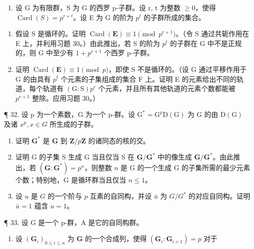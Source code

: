 \begin{enumerate}
\def\labelenumi{\arabic{enumi}。}
\setcounter{enumi}{30}
\tightlist
\item
  设 G 为有限群，S 为 G 的西罗 p-子群。设 r, t 为整数 \(\geqslant0\)，使得 \(\operatorname{Card}(S)=p^{r+t}\)。设 E 为 G 的阶为 \(p^{t}\) 的子群所成的集合。
\end{enumerate}

\begin{enumerate}
\def\labelenumi{(\alph{enumi})}
\item
  假设 S 是循环的。证明 \(\operatorname{Card}(\mathbf{E}) \equiv 1 \pmod{p^{r+1}}\)。（令 S 通过共轭作用在 E 上，并利用习题 30。）由此推出，若 S 的阶为 \(p^{t}\) 的子群在 G 中不是正规的，则 G 中至少有 \(1 + p^{r+1}\) 个西罗 p-子群。
\item
  证明 \(\operatorname{Card}(\mathbf{E}) \equiv 1 \pmod{p}\)，即使 S 不是循环的。（设 G 通过平移作用于 G 的由具有 \(p^{t}\) 个元素的子集组成的集合 F 上。证明 E 的元素给出不同的轨道，每个轨道有 \((\mathrm{G}: \mathrm{S})p^{r}\) 个元素，并且所有其他轨道的元素个数都能被 \(p^{r+1}\) 整除。应用习题 30。）
\end{enumerate}

¶ 32. 设 p 为一个素数，G 为一个 p-群。设 \(\mathrm{G}^{*} = \mathrm{G}^{p}\mathrm{D}(\mathrm{G})\) 为 G 的由 \(\mathrm{D}(\mathrm{G})\) 及诸 \(x^{p}, x \in G\) 所生成的子群。

\begin{enumerate}
\def\labelenumi{(\alph{enumi})}
\item
  证明 \(\mathbf{G}^*\) 是 \(\mathbf{G}\) 到 \(\mathbf{Z} / p\mathbf{Z}\) 的诸同态的核的交。
\item
  证明 G 的子集 S 生成 G 当且仅当 S 在 \(\mathbf{G} / \mathbf{G}^*\) 中的像生成 \(\mathbf{G} / \mathbf{G}^*\)。由此推出，若 \((\mathbf{G}:\mathbf{G}^{*}) = p^{n}\)，则整数 \(n\) 是 G 的一个生成 G 的子集所需的最少元素个数；特别地，G 是循环群当且仅当 \(n\leqslant 1\)。
\item
  设 \(u\) 是 \(G\) 的一个阶与 \(p\) 互素的自同构，并设 \(\bar{u}\) 为 \(G / G^*\) 的对应自同构。证明 \(\bar{u} = 1\) 蕴含 \(u = 1\)。
\end{enumerate}

¶ 33. 设 G 是一个 p-群，A 是它的自同构群。

\begin{enumerate}
\def\labelenumi{(\alph{enumi})}
\tightlist
\item
  设 \((\mathbf{G}_i)_{0\leqslant i\leqslant n}\) 为 \(\mathbf{G}\) 的一个合成列，使得 \((\mathbf{G}_i:\mathbf{G}_{i + 1}) = p\) 对于
\end{enumerate}

